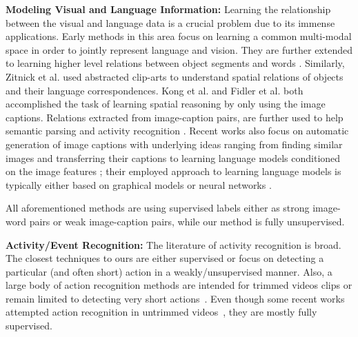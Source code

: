 \noindent\textbf{Modeling Visual and Language Information:}
Learning the relationship between the visual and language data is a crucial problem due to its immense applications. Early methods \cite{matching} in this area focus on learning a common multi-modal space in order to jointly represent language and vision. They are further extended to learning higher level relations between object segments and words \cite{connecting}. Similarly, Zitnick et al.\cite{zitnick2013learning,zitnick2013bringing} used abstracted clip-arts to understand spatial relations of objects and their language correspondences. Kong et al. \cite{kong2014you} and Fidler et al. \cite{fidler2013sentence} both accomplished the task of learning spatial reasoning by only using the image captions. Relations extracted from image-caption pairs, are further used to help semantic parsing \cite{yu2013grounded} and activity recognition \cite{motwani2012improving}. Recent works also focus on automatic generation of image captions with underlying ideas ranging from finding similar images and transferring their captions \cite{ordonez2011im2text} to learning language models conditioned on the image features \cite{kiros2014multimodal,socher2014grounded,farhadi2010every}; their employed approach to learning language models is typically either based on graphical models \cite{farhadi2010every} or neural networks \cite{socher2014grounded,kiros2014multimodal,deepAlignment}.

All aforementioned methods are using supervised labels either as strong image-word pairs or weak image-caption pairs, while our method is fully unsupervised.

\noindent\textbf{Activity/Event Recognition:}
The literature of activity recognition is broad. The closest techniques to ours are either supervised or focus on detecting a particular (and often short) action in a weakly/unsupervised manner. Also, a large body of action recognition methods are intended for trimmed videos clips or remain limited to detecting very short actions~\cite{kuehne2011hmdb, UCF101, niebles10_eccv, laptev08_cvpr, efros03_iccv, ryoo09_iccv}. Even though some recent works attempted action recognition in untrimmed videos~\cite{THUMOS14, oneata2014lear, jainuniversity}, they are mostly fully supervised.

